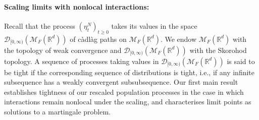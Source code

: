 \documentclass[EJP]{ejpecp} %
\newcommand{\IR}{\mathbb R}
\newcommand{\measures}{\mathcal{M}_F(\IR^d)} %
\begin{document}
\paragraph{Scaling limits with nonlocal interactions:}
Recall that the process $(\eta_t^N)_{t\geq 0}$ takes its values in the space
${\mathcal D}_{[0,\infty)}(\measures)$ of c\`adl\`ag
paths on $\measures$. We endow $\measures$ with the topology of weak convergence
and 
${\mathcal D}_{[0,\infty)}(\measures)$ with the Skorohod topology.
A sequence of processes taking values in 
${\mathcal D}_{[0,\infty)}(\measures)$ is said to be tight if the corresponding
sequence of distributions is tight,
i.e., if any infinite subsequence has a weakly convergent subsubsequence.
Our first main result establishes tightness of our rescaled population processes in 
the case in which interactions remain nonlocal under the scaling, and 
characterises limit points as solutions to a martingale problem. 
\end{document}
